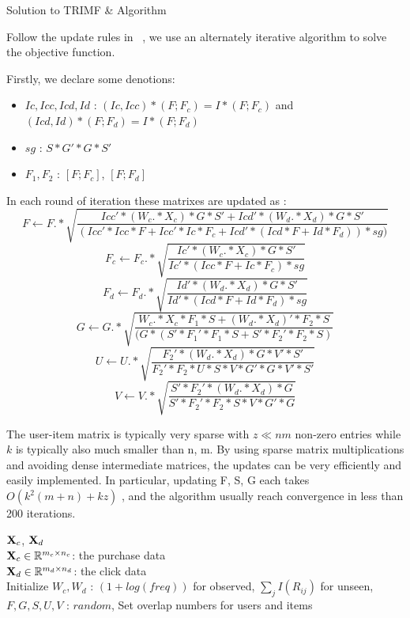 \begin{section}
  {Solution to TRIMF \& Algorithm}
\par{Follow the update rules in ~\cite{Zhuang:2011:EAW:1952191.1952195}, we use an alternately iterative algorithm to solve the objective function.}

Firstly, we declare some denotions:
\begin{itemize}
	\item $Ic,Icc,Icd,Id$ : $(Ic,Icc)*(F;F_c) = I*(F;F_c)$ and $(Icd,Id)*(F;F_d) = I*(F;F_d)$
	\item $sg$ : $S*G'*G*S'$
	\item $F_1, F_2$ : $[F;F_c]$, $[F;F_d]$
\end{itemize}
\par{In each round of iteration these matrixes are updated as :
$$F \leftarrow F .* \sqrt{\frac{Icc'*(W_c.*X_c)*G*S' + Icd'*(W_d.*X_d)*G*S'}{(Icc'*Icc*F + Icc'*Ic*F_c + Icd'*(Icd*F + Id*F_d))*sg)}}$$
$$F_c \leftarrow F_c .* \sqrt{\frac{Ic'*(W_c.*X_c)*G*S'}{Ic'*(Icc*F + Ic*F_c)*sg}}$$
$$F_d \leftarrow F_d .* \sqrt{\frac{Id'*(W_d.*X_d)*G*S'}{Id'*(Icd*F + Id*F_d)*sg }}$$
$$G \leftarrow G .* \sqrt{\frac{W_c.*X_c*F_1*S + (W_d.*X_d)'*F_2*S}{(G*(S'*F_1'*F_1*S + S'*F_2'*F_2*S)}}$$
$$U \leftarrow U .* \sqrt{\frac{F_2'*(W_d.*X_d)*G*V'*S'}{F_2'*F_2*U*S*V*G'*G*V'*S'}}$$
$$V \leftarrow V .* \sqrt{\frac{S'*F_2'*(W_d.*X_d)*G}{S'*F_2'*F_2*S*V*G'*G}} $$



}

\par{The user-item matrix is typically very sparse with $z \ll nm$ non-zero entries while $k$ is typically
also much smaller than n, m. By using sparse matrix multiplications and avoiding dense intermediate matrices, the updates can be very efficiently
and easily implemented. In particular, updating F, S, G each takes $O(k^2 (m + n) + kz)$ , and the algorithm usually reach convergence in less than 200 iterations.}

\begin{algorithm}[tb]
\caption{Algorithm for TRIMF.}
\begin{algorithmic}

 $\mathbf{X}_{c}$, $\mathbf{X}_{d}$\\
$\mathbf{X}_{c} \in \mathbb{R}^{m_c\times n_c}$: the purchase data \\
$\mathbf{X}_{d} \in \mathbb{R}^{m_d\times n_d}$: the click data\\

 Initialize $W_c, W_d$ : $(1+log(freq))$ for observed, $\sum_jI({R_{ij}})$ for unseen, $F,G,S,U,V$ : $random$, Set overlap numbers for users and items


\end{algorithmic}
\end{algorithm}
\end{section}

